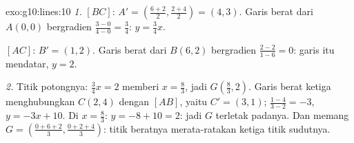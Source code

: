 \begin{solution}{exo:g10:lines:10}
\emph{1.}  $[BC]$: $A' = \left(\frac{6+2}{2},
\frac{2+4}{2}\right) = (4, 3)$. Garis berat dari $A(0,0)$ bergradien
$\frac{3 - 0}{4 - 0} = \frac34$:  $y = \frac34 x$.

 $[AC]$: $B' = (1, 2)$. Garis berat dari $B(6, 2)$ bergradien
$\frac{2 - 2}{1 - 6} = 0$: garis itu mendatar, $y = 2$.

\emph{2.} Titik potongnya: $\frac34 x = 2$ memberi $x = \frac83$, jadi
$G\left(\frac83, 2\right)$. Garis berat ketiga menghubungkan $C(2,4)$ dengan
 $[AB]$, yaitu $C' = (3, 1)$; 
$\frac{1 - 4}{3 - 2} = -3$,  $y = -3x + 10$. Di $x = \frac83$:
$y = -8 + 10 = 2$: jadi $G$ terletak padanya. Dan memang
$G = \left(\frac{0 + 6 + 2}{3}, \frac{0 + 2 + 4}{3}\right)$: titik
beratnya merata-ratakan  ketiga titik sudutnya.
\end{solution}


